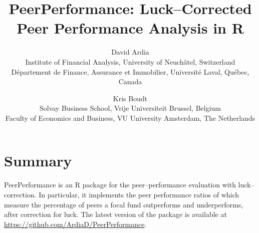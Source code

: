 \documentclass[11pt]{article}
\begin{document}
\title{PeerPerformance: Luck--Corrected Peer Performance Analysis in R}
\author{David Ardia\\
Institute of Financial Analysis, University of Neuch\^atel, Switzerland\\
D\'epartement de Finance, Assurance et Immobilier, Universit\'e Laval, Qu\'ebec, Canada
\and
Kris Boudt\\
Solvay Business School, Vrije Universiteit Brussel, Belgium\\
Faculty of Economics and Business, VU University Amsterdam, The Netherlands
}
	
\maketitle

\section*{Summary}

PeerPerformance is an R package \citep{R} for the peer--performance evaluation with luck--correction. In particular, it implements the peer performance ratios of \citet{ArdiaBoudt2016} which measure the percentage of peers 
a focal fund outperforms and underperforms, after correction
for luck. The latest version of the package
is available at \url{https://github.com/ArdiaD/PeerPerformance}.



	
\end{document}
